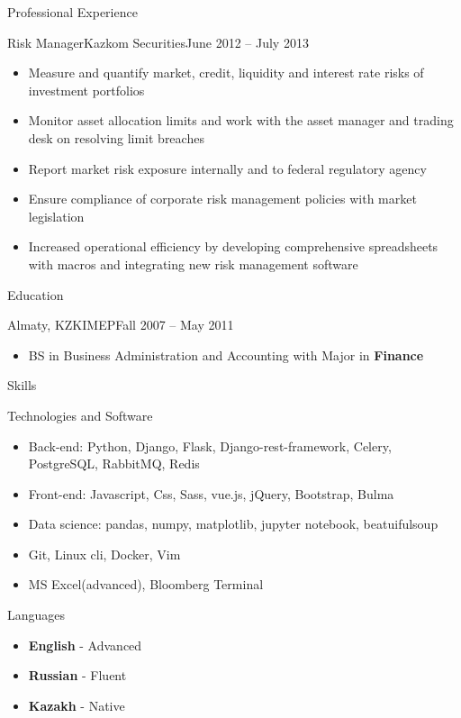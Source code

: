 \documentclass[]{mcdowellcv}
\begin{document}
\begin{cvsection}{Professional Experience}
  \begin{cvsubsection}{Risk Manager}{Kazkom Securities}{June 2012 -- July 2013}
    \begin{itemize}
      \item Measure and quantify market, credit, liquidity and interest rate risks of investment portfolios
      \item Monitor asset allocation limits and work with the asset manager and trading desk on resolving limit breaches
      \item Report market risk exposure internally and to federal regulatory agency
      \item Ensure compliance of corporate risk management policies with market legislation
      \item Increased operational efficiency by developing comprehensive spreadsheets with macros and integrating new risk management software
    \end{itemize}
  \end{cvsubsection}
\end{cvsection}

\pagebreak

\begin{cvsection}{Education}
  \begin{cvsubsection}{Almaty, KZ}{KIMEP}{Fall 2007 -- May 2011}
    \begin{itemize}
      \item BS in Business Administration and Accounting with Major in \textbf{Finance}
    \end{itemize}
  \end{cvsubsection}
\end{cvsection}

\begin{cvsection}{Skills}
  \begin{cvsubsection}{Technologies and Software}{}{}	
      \begin{itemize}
        \item Back-end: Python, Django, Flask, Django-rest-framework, Celery, PostgreSQL, RabbitMQ, Redis
        \item Front-end: Javascript, Css, Sass, vue.js, jQuery, Bootstrap, Bulma
        \item Data science: pandas, numpy, matplotlib, jupyter notebook, beatuifulsoup
        \item Git, Linux cli, Docker, Vim
        \item MS Excel(advanced), Bloomberg Terminal
      \end{itemize}
  \end{cvsubsection}
  \begin{cvsubsection}{Languages}{}{}	
    \begin{itemize}
      \item \textbf{English} - Advanced
      \item \textbf{Russian} - Fluent
      \item \textbf{Kazakh} - Native
    \end{itemize}
  \end{cvsubsection}
\end{cvsection}
\end{document}
